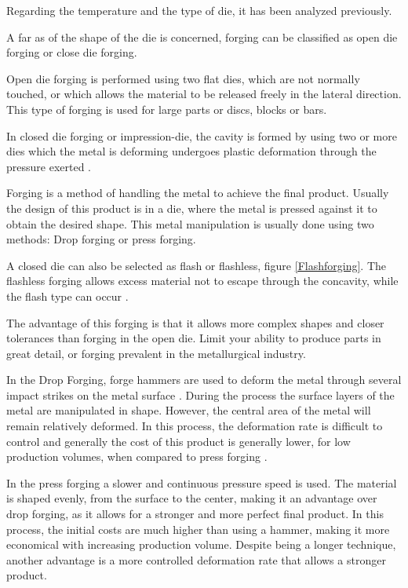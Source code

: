 Regarding the temperature and the type of die, it has been analyzed previously.\par
A far as of the shape of the die is concerned, forging can be classified as open die forging or close die forging.\par
Open die forging is performed using two flat dies, which are not normally touched, or which allows the material to be released freely in the lateral direction. This type of forging is used for large parts or discs, blocks or bars.\cite{site4,site3,souza2015estudo}\par
In closed die forging or  impression-die, the cavity is formed by using two or more dies which the metal is deforming undergoes plastic deformation through the pressure exerted \cite{site4} \cite{site3,souza2015estudo}.\par
Forging is a method of handling the metal to achieve the final product. Usually the design of this product is in a die, where the metal is pressed against it to obtain the desired shape. This metal manipulation is usually done using two methods: Drop forging or press forging. \par
A closed die can also be selected as flash or flashless,  figure \ref{Flashforging}. The flashless forging allows excess material not to escape through the concavity, while the flash type can occur \cite{site4,site3,souza2015estudo}.\par
The advantage of this forging is that it allows more complex shapes and closer tolerances than forging in the open die. Limit your ability to produce parts in great detail, or forging prevalent in the metallurgical industry\cite{site5,souza2015estudo}.\par

In the Drop Forging, forge hammers are used to deform the metal through several impact strikes on the metal surface \cite{site3,altan2004cold}. During the process the surface layers of the metal are manipulated in shape. However, the central area of the metal will remain relatively deformed. In this process, the deformation rate is difficult to control and generally the cost of this product is generally lower, for low production volumes, when compared to press forging \cite{site3,altan2004cold}.  \pair

In the press forging a slower and continuous pressure speed is used. The material is shaped evenly, from the surface to the center, making it an advantage over drop forging, as it allows for a stronger and more perfect final product\cite{site3,altan2004cold}.  \pair
In this process, the initial costs are much higher than using a hammer, making it more economical with increasing production volume. Despite being a longer technique, another advantage is a more controlled deformation rate that allows a stronger product\cite{site3,altan2004cold}. \par

